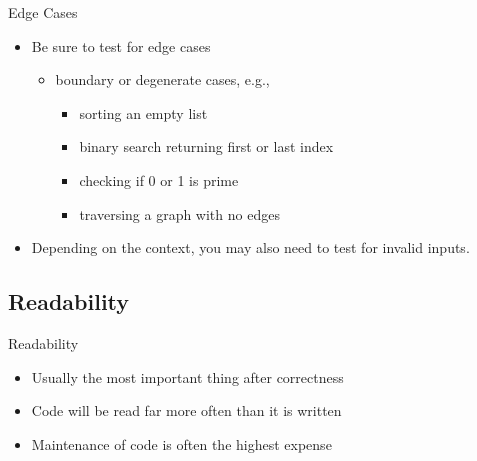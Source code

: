 \begin{frame}{Edge Cases}
    \pause
    \begin{itemize}[<+->]
        \item Be sure to test for \alert{edge cases}
              \begin{itemize}[<+->]
                  \item boundary or degenerate cases, e.g.,
                        \begin{itemize}[<+->]
                            \item sorting an \alert{empty} list
                            \item binary search returning \alert{first} or \alert{last} index
                            \item checking if 0 or 1 is \alert{prime}
                            \item traversing a graph with \alert{no edges}
                        \end{itemize}
              \end{itemize}
        \item Depending on the context, you may also need to test for \alert{invalid inputs}.
    \end{itemize}
\end{frame}

\subsection{Readability}
\begin{frame}{Readability}
    \pause
    \begin{itemize}[<+->]
        \item Usually the most important thing after correctness
        \item Code will be read far more often than it is written
        \item Maintenance of code is often the highest expense
    \end{itemize}
\end{frame}

